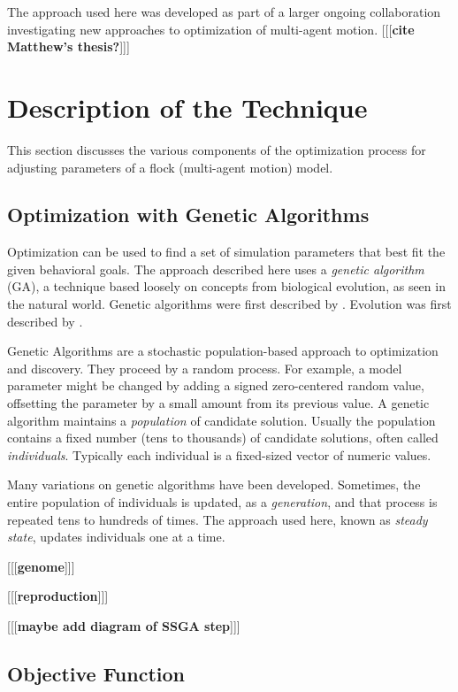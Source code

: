 \documentclass[letterpaper]{article}
\begin{document}
The approach used here was developed as part of a larger ongoing collaboration investigating new approaches to optimization of multi-agent motion. [[[\textbf{cite Matthew's thesis?}]]]

\section{Description of the Technique}
\label{sec:Description}

This section discusses the various components of the optimization process for adjusting parameters of a flock (multi-agent motion) model.

\subsection{Optimization with Genetic Algorithms}
\label{subsec:Optimization_with_GA}

Optimization can be used to find a set of simulation parameters that best fit the given behavioral goals. The approach described here uses a \textit{genetic algorithm} (GA), a technique based loosely on concepts from biological evolution, as seen in the natural world. Genetic algorithms were first described by \citet{holland_adaptation_1975}. Evolution was first described by \citet{darwin_origin_1859}.

Genetic Algorithms are a stochastic population-based approach to optimization and discovery. They proceed by a random process. For example, a model parameter might be changed by adding a signed zero-centered random value, offsetting the parameter by a small amount from its previous value. A genetic algorithm maintains a \textit{population} of candidate solution. Usually the population contains a fixed number (tens to thousands) of candidate solutions, often called \textit{individuals}. Typically each individual is a fixed-sized vector of numeric values.

Many variations on genetic algorithms have been developed. Sometimes, the entire population of individuals is updated, as a \textit{generation}, and that process is repeated tens to hundreds of times. The approach used here, known as \textit{steady state}, updates individuals one at a time.

[[[\textbf{genome}]]]

[[[\textbf{reproduction}]]]

[[[\textbf{maybe add diagram of SSGA step}]]]

\subsection{Objective Function}
\label{subsec:Objective_Function}
\end{document}
